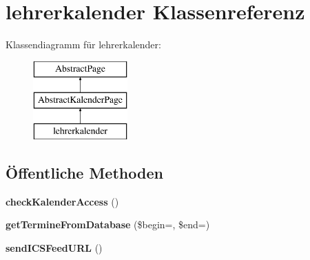 \hypertarget{classlehrerkalender}{}\section{lehrerkalender Klassenreferenz}
\label{classlehrerkalender}
Klassendiagramm für lehrerkalender\+:\begin{figure}[H]
\begin{center}
\leavevmode
\includegraphics[height=3.000000cm]{classlehrerkalender}
\end{center}
\end{figure}
\subsection*{Öffentliche Methoden}
\begin{DoxyCompactItemize}
\item 
\mbox{\label{classlehrerkalender_a82309e9d35d775b9d1f73893049762ef}} 
{\bfseries check\+Kalender\+Access} ()
\item 
\mbox{\label{classlehrerkalender_a89b23e9755b1f2a2a40d5ef6253f656b}} 
{\bfseries get\+Termine\+From\+Database} (\$begin=\textquotesingle{}\textquotesingle{}, \$end=\textquotesingle{}\textquotesingle{})
\item 
\mbox{\label{classlehrerkalender_a036830456c5b4d4b0e4a2d8fca214b67}} 
{\bfseries send\+I\+C\+S\+Feed\+U\+RL} ()
\end{DoxyCompactItemize}
